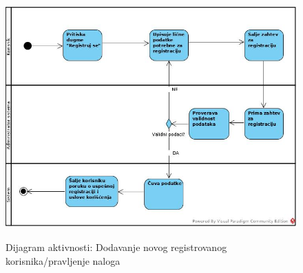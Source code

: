 \documentclass[20pt]{article}
\begin{document}
\begin{figure}[h]
		\centering
		\includegraphics[width=1.1\textwidth,height=0.74\textheight]{Pictures/DodavanjeNovogRegistrovanogKorisnika.jpg}\\
		\caption{Dijagram aktivnosti: Dodavanje novog registrovanog korisnika/pravljenje naloga}
		\label{fig:dijagramAktivnostiDodavanjeKorisnika}
	\end{figure}
\newpage
\newpage
\end{document}
